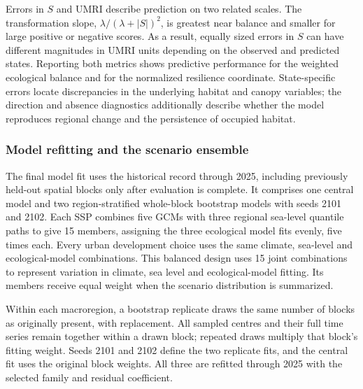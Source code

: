 Errors in $S$ and UMRI describe prediction on two related scales. The transformation slope, $\lambda/(\lambda+|S|)^2$, is greatest near balance and smaller for large positive or negative scores. As a result, equally sized errors in $S$ can have different magnitudes in UMRI units depending on the observed and predicted states. Reporting both metrics shows predictive performance for the weighted ecological balance and for the normalized resilience coordinate. State-specific errors locate discrepancies in the underlying habitat and canopy variables; the direction and absence diagnostics additionally describe whether the model reproduces regional change and the persistence of occupied habitat.

\subsubsection{Model refitting and the scenario ensemble}

The final model fit uses the historical record through 2025, including previously held-out spatial blocks only after evaluation is complete. It comprises one central model and two region-stratified whole-block bootstrap models with seeds 2101 and 2102. Each SSP combines five GCMs with three regional sea-level quantile paths to give 15 members, assigning the three ecological model fits evenly, five times each. Every urban development choice uses the same climate, sea-level and ecological-model combinations. This balanced design uses 15 joint combinations to represent variation in climate, sea level and ecological-model fitting. Its members receive equal weight when the scenario distribution is summarized.


Within each macroregion, a bootstrap replicate draws the same number of blocks as originally present, with replacement. All sampled centres and their full time series remain together within a drawn block; repeated draws multiply that block's fitting weight. Seeds 2101 and 2102 define the two replicate fits, and the central fit uses the original block weights. All three are refitted through 2025 with the selected family and residual coefficient.

